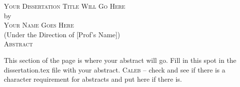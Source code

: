 \documentclass[12pt, notitlepage ]{report}
\begin{document}

\newcommand{\doctitle}{Your Dissertation Title Will Go Here}
\newcommand{\docauthor}{Your Name Goes Here}



\newpage
{}

\thispagestyle{empty}
\vspace*{18pt}
\begin{center}
  \textsc{\large{\doctitle}}\\[18pt]  %
  by\\[18pt]
  \textsc{\docauthor}\\[12pt]
  (Under the Direction of [Prof's Name])\\[12pt]
  \textsc{Abstract}
\end{center}

This section of the page is where your abstract will go. Fill in this spot in the dissertation.tex file with your abstract. \textsc{Caleb} -- check and see if there is a character requirement for abstracts and put here if there is.

\thispagestyle{empty}

\begin{list}{\textsc{Index words:\hfill}}{\leftmargin 1.4in}
  \item
  \begin{flushleft}
  \end{flushleft}
\end{list}


\newpage




\newpage



\newpage







\tableofcontents

\listoffigures
\listoftables
\clearpage









\begin{appendices}
  
\end{appendices}

\newpage


\end{document}
